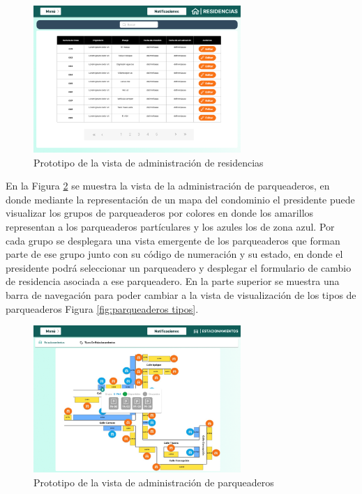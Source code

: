 \begin{figure}[H]
    \centering
    \includegraphics[width=0.7\textwidth]{resources/images/residencias}
    \caption{Prototipo de la vista de administración de residencias}
    \label{fig:residencias}
\end{figure}


En la Figura \ref{fig:parqueaderos} se muestra la vista de la administración de parqueaderos, en donde mediante la representación de un mapa del condominio el presidente puede visualizar los grupos de parqueaderos por colores en donde los amarillos representan a los parqueaderos partículares y los azules los de zona azul.
Por cada grupo se desplegara una vista emergente de los parqueaderos que forman parte de ese grupo junto con su código de numeración y su estado,
en donde el presidente podrá seleccionar un parqueadero y desplegar el formulario de cambio de residencia asociada a ese parqueadero.
En la parte superior se muestra una barra de navegación para poder cambiar a la vista de visualización de los tipos de parqueaderos Figura \ref{fig:parqueaderos tipos}.
\begin{figure}[H]
    \centering
    \includegraphics[width=0.7\textwidth]{resources/images/estacionamientos-organization}
    \caption{Prototipo de la vista de administración de parqueaderos}
    \label{fig:parqueaderos}
\end{figure}

